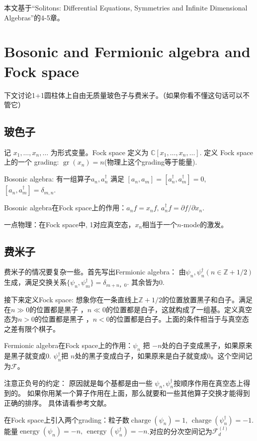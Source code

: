 \newcommand{\gr}{\operatorname{gr}}
\newcommand{\charge}{\operatorname{charge}}
\newcommand{\energy}{\operatorname{energy}}
本文基于“Solitons: Differential Equations, Symmetries and Infinite Dimensional Algebras”的4-5章。
\section{Bosonic and Fermionic algebra and Fock space}
下文讨论1+1圆柱体上自由无质量玻色子与费米子。（如果你看不懂这句话可以不管它）
\subsection{玻色子}
记 $x_1,\dots,x_n,\dots$ 为形式变量。Fock space 定义为
$\mathbb{C}[x_1,\dots,x_n,\dots]$. 定义 Fock space 上的一个 grading: $\gr(x_n)=n$(物理上这个grading等于能量).

Bosonic algebra: 有一组算子$a_n,a_n^{\dagger}$ 满足 $[a_n,a_m]=[a_n^{\dagger},a_m^{\dagger}]=0$,
$[a_n,a_m^{\dagger}]=\delta_{m,n}$.

Bosonic algebra在Fock space上的作用：$a_nf=x_nf,\,a_n^{\dagger}f=\partial f/\partial x_n$.

一点物理：在Fock space中, 1对应真空态，$x_n$相当于一个$n$-mode的激发。
\subsection{费米子}
费米子的情况要复杂一些。首先写出Fermionic algebra： 由$\psi_n,\psi_n^{\dagger}(n\in\mathbb{Z}+1/2)$生成，满足交换关系$\{\psi_n,\psi_m^{\dagger}\}=\delta_{m+n，0}$. 其余皆为0.

接下来定义Fock space: 想象你在一条直线上$\mathbb{Z}+1/2$的位置放置黑子和白子。满足在$n\gg 0$的位置都是黑子
，$n\ll 0$的位置都是白子，这就构成了一组基。定义真空态为$n > 0$的位置都是黑子
，$n < 0$的位置都是白子。上面的条件相当于与真空态之差有限个棋子。

Fermionic algebra在Fock space上的作用：$\psi_n$ 把 $-n$处的白子变成黑子，如果原来是黑子就变成0.
$\psi_n^{\dagger}$把 $n$处的黑子变成白子，如果原来是白子就变成0。这个空间记为$\mathcal{F}$。

注意正负号的约定：
原因就是每个基都是由一些
$\psi_n,\psi_n^{\dagger}$按顺序作用在真空态上得到的。
如果你用某一个算子作用在上面，那么就要和一些其他算子交换才能得到正确的排序。
具体请看参考文献。

在Fock space上引入两个grading：粒子数$\charge(\psi_n)=1,\,\charge(\psi_n^{\dagger})=-1$.
能量$\energy(\psi_n)=-n,\,\energy(\psi_n^{\dagger})=-n$.对应的分次空间记为$\mathcal{F}^{(l)}_d$

